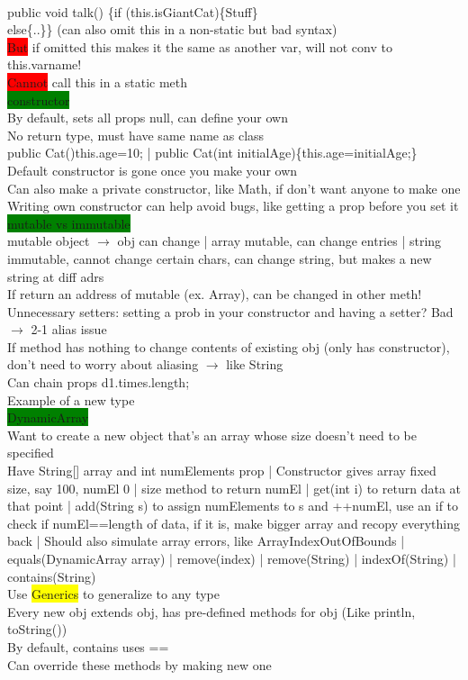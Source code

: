 \\ public void talk() \{if (this.isGiantCat)\{Stuff\}
\\ else\{..\}\} (can also omit this in a non-static but bad syntax)
\\ \colorbox{Red}{But} if omitted this makes it the same as another var, will not conv to this.varname!
\\ \colorbox{Red}{Cannot} call this in a static meth
\\ \colorbox{Green}{constructor}
\\ By default, sets all props null, can define your own
\\ No return type, must have same name as class
\\ public Cat(){this.age=10;} | public Cat(int initialAge)\{this.age=initialAge;\}
\\ Default constructor is gone once you make your own
\\ Can also make a private constructor, like Math, if don't want anyone to make one
\\ Writing own constructor can help avoid bugs, like getting a prop before you set it
\\ \colorbox{Green}{mutable vs immutable}
\\ mutable object $\rightarrow$ obj can change | array mutable, can change entries | string immutable, cannot change certain chars, can change string, but makes a new string at diff adrs
\\ If return an address of mutable (ex. Array), can be changed in other meth!
\\ Unnecessary setters: setting a prob in your constructor and having a setter? Bad $\rightarrow$ 2-1 alias issue
\\ If method has nothing to change contents of existing obj (only has constructor), don't need to worry about aliasing $\rightarrow$ like String
\\ Can chain props d1.times.length;
\\ Example of a new type
\\ \colorbox{Green}{DynamicArray}
\\ Want to create a new object that's an array whose size doesn't need to be specified
\\ Have String[] array and int numElements prop | Constructor gives array fixed size, say 100, numEl 0 | size method to return numEl | get(int i) to return data at that point | add(String s) to assign numElements to s and ++numEl, use an if to check if numEl==length of data, if it is, make bigger array and recopy everything back | Should also simulate array errors, like ArrayIndexOutOfBounds | equals(DynamicArray array) | remove(index) | remove(String) | indexOf(String) | contains(String)
\\ Use \colorbox{Yellow}{Generics} to generalize to any type
\\ Every new obj extends obj, has pre-defined methods for obj (Like println, toString())
\\ By default, contains uses ==
\\ Can override these methods by making new one
